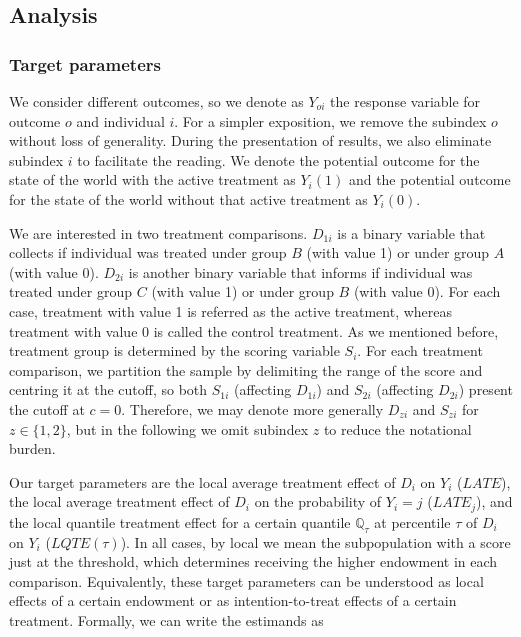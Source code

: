 \documentclass[
  11pt]{article}
\begin{document}
\subsection{Analysis}\label{analysis}

\subsubsection{Target parameters}\label{target-parameters}

We consider different outcomes, so we denote as \(Y_{oi}\) the response
variable for outcome \(o\) and individual \(i\). For a simpler
exposition, we remove the subindex \(o\) without loss of generality.
During the presentation of results, we also eliminate subindex \(i\) to
facilitate the reading. We denote the potential outcome for the state of
the world with the active treatment as \(Y_i(1)\) and the potential
outcome for the state of the world without that active treatment as
\(Y_i(0)\).

We are interested in two treatment comparisons. \(D_{1i}\) is a binary
variable that collects if individual was treated under group \(B\) (with
value 1) or under group \(A\) (with value 0). \(D_{2i}\) is another
binary variable that informs if individual was treated under group \(C\)
(with value 1) or under group \(B\) (with value 0). For each case,
treatment with value 1 is referred as the active treatment, whereas
treatment with value 0 is called the control treatment. As we mentioned
before, treatment group is determined by the scoring variable \(S_i\).
For each treatment comparison, we partition the sample by delimiting the
range of the score and centring it at the cutoff, so both \(S_{1i}\)
(affecting \(D_{1i}\)) and \(S_{2i}\) (affecting \(D_{2i}\)) present the
cutoff at \(c=0\). Therefore, we may denote more generally \(D_{zi}\)
and \(S_{zi}\) for \(z \in \{1,2\}\), but in the following we omit
subindex \(z\) to reduce the notational burden.

Our target parameters are the local average treatment effect of \(D_i\)
on \(Y_i\) (\(LATE\)), the local average treatment effect of \(D_i\) on
the probability of \(Y_i=j\) (\(LATE_j\)), and the local quantile
treatment effect for a certain quantile \(\mathbb{Q}_\tau\) at
percentile \(\tau\) of \(D_i\) on \(Y_i\) (\(LQTE(\tau)\)). In all
cases, by local we mean the subpopulation with a score just at the
threshold, which determines receiving the higher endowment in each
comparison. Equivalently, these target parameters can be understood as
local effects of a certain endowment or as intention-to-treat effects of
a certain treatment. Formally, we can write the estimands as
\end{document}
